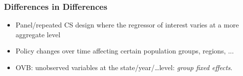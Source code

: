 \documentclass[notes=show,beamer,compress]{beamer}
\begin{document}



\begin{frame}
\frametitle{Differences in Differences}

\begin{itemize}
\item Panel/repeated CS design where the regressor of interest varies at a more aggregate level
\item Policy changes over time affecting certain population groups, regions, ...
\item OVB: unobserved variables at the state/year/\ldots level: \emph{group fixed effects}.

\end{itemize}
\end{frame}
\end{document}
